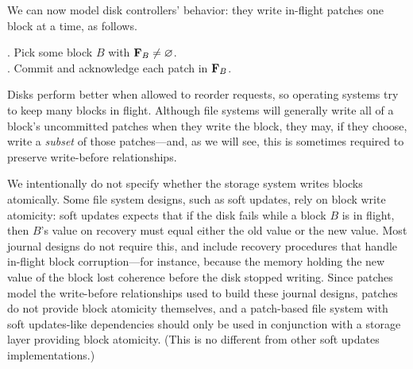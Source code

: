 We can now model disk controllers' behavior: they write in-flight patches one
 block at a time, as follows.
%
\begin{tabbing}
\qquad {}. Pick some block $B$ with $\PInf[B] \neq \emptyset$. \\
\qquad {}. Commit and acknowledge each patch in $\PInf[B]$.
\end{tabbing}
%
\noindent
%
Disks perform better when allowed to reorder requests, so operating systems
 try to keep many blocks in flight.
%
%
Although file systems will generally write all of a block's uncommitted
 patches when they write the block, they may, if they choose, write a
 \emph{subset} of those patches---and, as we will see, this is sometimes
 required to preserve write-before relationships.


We intentionally do not specify whether the storage system writes blocks
 atomically.
%
Some file system designs, such as soft updates, rely on block write
 atomicity:
%
soft updates expects that if the disk fails while a block $B$ is
 in flight, then $B$'s value on recovery must equal either the old value or
 the new value.
%
Most journal designs do not require this, and include recovery procedures
 that handle in-flight block corruption---for instance, because the memory
 holding the new value of the block lost coherence before the disk stopped
 writing.
%
Since patches model the write-before relationships used to build these
 journal designs, patches do not provide block atomicity themselves, and
%
a patch-based file system with soft updates-like dependencies
 should only be used in conjunction with a storage layer providing block
 atomicity.  (This is no different from other soft updates
 implementations.)


\begin{comment}
This model does not completely define the disk's behavior on system crash,
 in particular with respect to in-flight blocks.
%
%
Most journal designs do not rely on this assumption, and can recover
 properly even if in-flight blocks are corrupted---for instance,
 because the memory holding the new value of the block lost its coherence
 before the disk stopped writing~\cite{nightingale06rethink}.
%
However, some disks may actually provide an atomicity guarantee, for
 instance by using non-volatile memory to store blocks before they make it
 onto disk.
%
The \Kudos\ core makes no assumptions about block atomicity, instead relying
 on software above it to implement a consistency protocol that makes sense
 for the given disk.
\end{comment}


